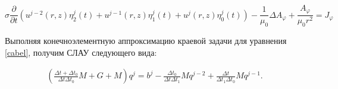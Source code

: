 \begin{equation} \label{cabel}
	\sigma \frac{\partial}{\partial t} \left(u^{j-2}(r, z) \eta_2^j(t) + u^{j-1}(r, z) \eta_1^j(t) + u^j(r, z) \eta_0^j(t)\right) -\frac{1}{\mu_0} \Delta A_{\varphi} + \frac{A_{\varphi}}{\mu_0 r^2} = J_{\varphi}
\end{equation}

Выполняя конечноэлементную аппроксимацию краевой задачи для уравнения \ref{cabel}, получим СЛАУ следующего вида:


\begin{multline} \label{gabel}
	\left(\frac{\Delta t + \Delta t_0}{\Delta t \Delta t_0} M + G + M\right)q^{j} = b^{j} - \frac{\Delta t_0}{\Delta t \Delta t_1} M q^{j - 2} + \frac{\Delta t}{\Delta t_1 \Delta t_0} M q^{j - 1}.
\end{multline}

